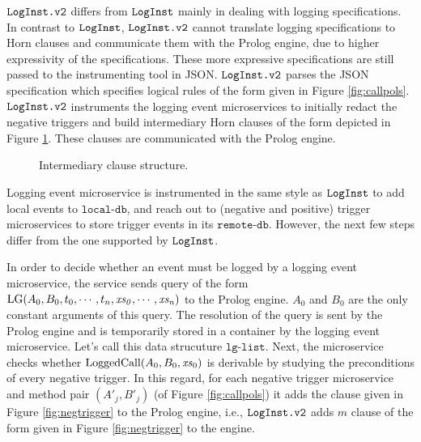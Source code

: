$\texttt{LogInst.v2}$ differs from $\texttt{LogInst}$ mainly in dealing with logging specifications. In contrast to $\texttt{LogInst}$, $\texttt{LogInst.v2}$ cannot translate logging specifications to Horn clauses and communicate them with the Prolog engine, due to higher expressivity of the specifications. These more expressive specifications are still passed to the instrumenting tool in JSON. $\texttt{LogInst.v2}$ parses the JSON specification which specifies logical rules of the form given in Figure \ref{fig:callpols}. $\texttt{LogInst.v2}$ instruments the logging event microservices to initially redact the negative triggers and build intermediary Horn clauses of the form depicted in Figure \ref{fig:intermediary}. These clauses are communicated with the Prolog engine. 


\begin{figure}
\setlength{\fboxsep}{0pt}%
\caption{Intermediary clause structure.} 
\label{fig:intermediary}
\end{figure}

Logging event microservice is instrumented in the same style as $\texttt{LogInst}$ to add local events to $\texttt{local-db}$, and reach out to (negative and positive) trigger microservices to store trigger events in its $\texttt{remote-db}$. However, the next few steps differ from the one supported by $\texttt{LogInst}$.

In order to decide whether an event must be logged by a logging event microservice, the service sends query of the form $\mathrm{LG}(A_0, B_0, t_0, \cdots, t_n,\mathit{xs_0}, \cdots, \mathit{xs_n})$ to the Prolog engine. $A_0$ and $B_0$ are the only constant arguments of this query. The resolution of the query is sent by the Prolog engine and is temporarily stored in a container by the logging event microservice. Let's call this data strucuture $\texttt{lg-list}$. %
Next, the microservice checks whether $\mathrm{LoggedCall}(A_0, B_0, \mathit{xs}_0)$ is derivable by studying the preconditions of every negative trigger. In this regard, for each negative trigger microservice and method pair $(A'_j, B'_j)$ (of Figure \ref{fig:callpols}) it adds the clause given in Figure \ref{fig:negtrigger} to the Prolog engine, i.e., $\texttt{LogInst.v2}$ adds $m$ clause of the form given in Figure \ref{fig:negtrigger} to the engine. 

